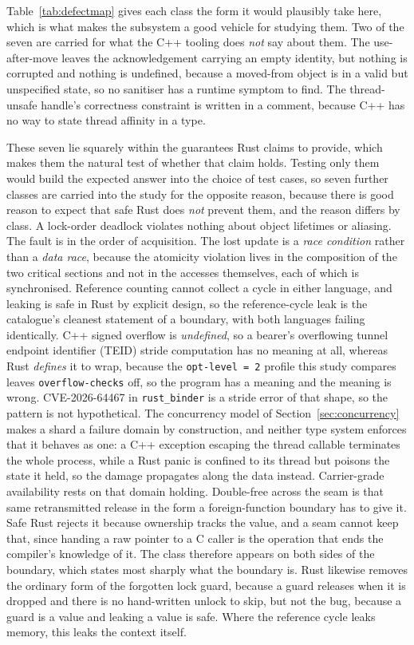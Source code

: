 Table~\ref{tab:defectmap} gives each class the form it would plausibly take here, which is what
makes the subsystem a good vehicle for studying them. Two of the seven are carried for what the
C++ tooling does \emph{not} say about them. The use-after-move leaves the acknowledgement
carrying an empty identity, but nothing is corrupted and nothing is undefined, because a
moved-from object is in a valid but unspecified state, so no sanitiser has a runtime symptom to
find. The thread-unsafe handle's correctness constraint is written in a comment, because C++ has
no way to state thread affinity in a type.

These seven lie squarely within the guarantees Rust claims to provide, which makes them the
natural test of whether that claim holds. Testing only them would build the expected answer into
the choice of test cases, so seven further classes are carried into the study for the opposite
reason, because there is good reason to expect that safe Rust does \emph{not} prevent them, and
the reason differs by class. A lock-order deadlock violates nothing about object lifetimes or
aliasing. The fault is in the order of acquisition. The lost update is a \emph{race condition}
rather than a \emph{data race}, because the atomicity violation lives in the composition of the
two critical sections and not in the accesses themselves, each of which is synchronised.
Reference counting cannot collect a cycle in either language, and leaking is safe in Rust by
explicit design, so the reference-cycle leak is the catalogue's cleanest statement of a
boundary, with both languages failing identically. C++ signed overflow is \emph{undefined}, so a
bearer's overflowing tunnel endpoint identifier (TEID) stride computation has no meaning at all,
whereas Rust \emph{defines} it to wrap, because the \texttt{opt-level~=~2} profile this study
compares leaves \texttt{overflow-checks} off, so the program has a meaning and the meaning is
wrong. CVE-2026-64467 in \texttt{rust\_binder} is a stride error of that shape, so the pattern
is not hypothetical. The concurrency model of Section~\ref{sec:concurrency} makes a shard a
failure domain by construction, and neither type system enforces that it behaves as one: a C++
exception escaping the thread callable terminates the whole process, while a Rust panic is
confined to its thread but poisons the state it held, so the damage propagates along the data
instead. Carrier-grade availability rests on that domain holding. Double-free across the seam is
that same retransmitted release in the form a foreign-function boundary has to give it. Safe
Rust rejects it because ownership tracks the value, and a seam cannot keep that, since handing a
raw pointer to a C caller is the operation that ends the compiler's knowledge of it. The class
therefore appears on both sides of the boundary, which states most sharply what the boundary is.
Rust likewise removes the ordinary form of the forgotten lock guard, because a guard releases
when it is dropped and there is no hand-written unlock to skip, but not the bug, because a guard
is a value and leaking a value is safe. Where the reference cycle leaks memory, this leaks the
context itself.

